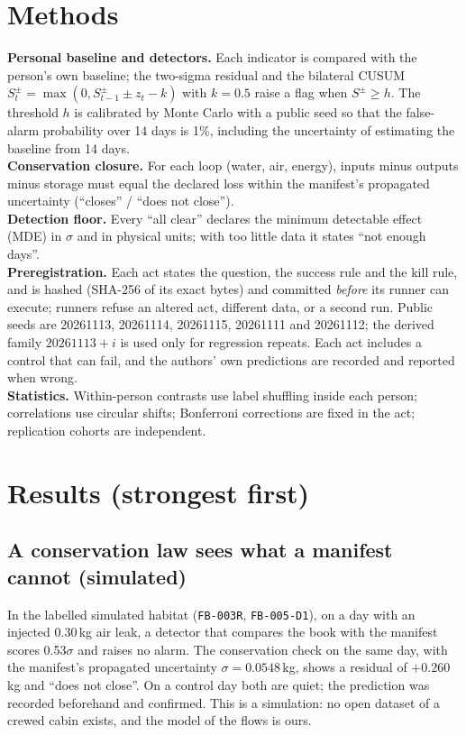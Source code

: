\documentclass[conference]{IEEEtran}
\newcommand{\act}[1]{\texttt{FB-#1}}
\newcommand{\sd}{$\sigma$}
\begin{document}
\section{Methods}
\textbf{Personal baseline and detectors.} Each indicator is compared with the person's own baseline; the two-sigma residual and the bilateral CUSUM $S^{\pm}_t=\max(0,S^{\pm}_{t-1}\pm z_t-k)$ with $k=0.5$ raise a flag when $S^{\pm}\geq h$. The threshold $h$ is calibrated by Monte Carlo with a public seed so that the false-alarm probability over 14 days is 1\%, including the uncertainty of estimating the baseline from 14 days.\\
\textbf{Conservation closure.} For each loop (water, air, energy), inputs minus outputs minus storage must equal the declared loss within the manifest's propagated uncertainty (``closes'' / ``does not close'').\\
\textbf{Detection floor.} Every ``all clear'' declares the minimum detectable effect (MDE) in $\sigma$ and in physical units; with too little data it states ``not enough days''.\\
\textbf{Preregistration.} Each act states the question, the success rule and the kill rule, and is hashed (SHA-256 of its exact bytes) and committed \emph{before} its runner can execute; runners refuse an altered act, different data, or a second run. Public seeds are 20261113, 20261114, 20261115, 20261111 and 20261112; the derived family $20261113+i$ is used only for regression repeats. Each act includes a control that can fail, and the authors' own predictions are recorded and reported when wrong.\\
\textbf{Statistics.} Within-person contrasts use label shuffling inside each person; correlations use circular shifts; Bonferroni corrections are fixed in the act; replication cohorts are independent.

\section{Results (strongest first)}
\subsection{A conservation law sees what a manifest cannot (simulated)}
In the labelled simulated habitat (\act{003R}, \act{005-D1}), on a day with an injected 0.30\,kg air leak, a detector that compares the book with the manifest scores 0.53\sd{} and raises no alarm. The conservation check on the same day, with the manifest's propagated uncertainty $\sigma=0.0548$\,kg, shows a residual of $+0.260$\,kg and ``does not close''. On a control day both are quiet; the prediction was recorded beforehand and confirmed. This is a simulation: no open dataset of a crewed cabin exists, and the model of the flows is ours.
\end{document}
